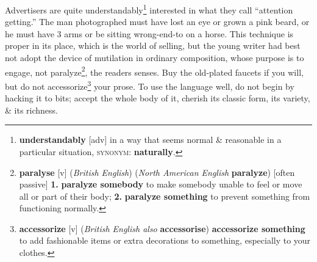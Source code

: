 \documentclass[oneside]{book}
\numberwithin{equation}{section}
\begin{document}
Advertisers are quite understandably\footnote{\textbf{understandably} [adv] in a way that seems normal \& reasonable in a particular situation, \textsc{synonym}: \textbf{naturally}.} interested in what they call ``attention getting.'' The man photographed must have lost an eye or grown a pink beard, or he must have 3 arms or be sitting wrong-end-to on a horse. This technique is proper in its place, which is the world of selling, but the young writer had best not adopt the device of mutilation in ordinary composition, whose purpose is to engage, not paralyze\footnote{\textbf{paralyse} [v] (\textit{British English}) (\textit{North American English} \textbf{paralyze}) [often passive] \textbf{1.} \textbf{paralyze somebody} to make somebody unable to feel or move all or part of their body; \textbf{2.} \textbf{paralyze something} to prevent something from functioning normally.}, the readers senses. Buy the old-plated faucets if you will, but do not accessorize\footnote{\textbf{accessorize} [v] (\textit{British English also} \textbf{accessorise}) \textbf{accessorize something} to add fashionable items or extra decorations to something, especially to your clothes.} your prose. To use the language well, do not begin by hacking it to bits; accept the whole body of it, cherish its classic form, its variety, \& its richness.
\end{document}
